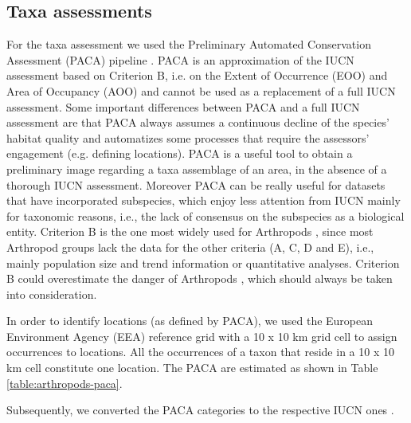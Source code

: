     \subsection{Taxa assessments}
    \label{subsec:arthropods-taxa-assessments}
For the taxa assessment we used the Preliminary Automated Conservation Assessment
(PACA) pipeline \parencite{stevart2019a-third}. PACA is an approximation of the IUCN
assessment based on Criterion B, i.e. on the Extent of Occurrence (EOO) and
Area of Occupancy (AOO) and cannot be used as a replacement of a full IUCN
assessment. Some important differences between PACA and a full IUCN assessment
are that PACA always assumes a continuous decline of the species’ habitat
quality and automatizes some processes that require the assessors' engagement
(e.g. defining locations). PACA is a useful tool to obtain a preliminary image
regarding a taxa assemblage of an area, in the absence of a thorough IUCN assessment.
Moreover PACA can be really useful for datasets that have incorporated subspecies,
which enjoy less attention from IUCN mainly for taxonomic reasons, i.e., the
lack of consensus on the subspecies as a biological entity. Criterion B is the
one most widely used for Arthropods \parencite{cardoso2011adapting,carpaneto2015a-red-list},
since most Arthropod groups lack the data for the other criteria (A, C, D and E),
i.e., mainly population size and trend information or quantitative analyses.
Criterion B could overestimate the danger of Arthropods \parencite{cardoso2011adapting},
which should always be taken into consideration.

In order to identify locations (as defined by PACA), we used the European
Environment Agency (EEA) reference grid with a 10 x 10 km grid cell to assign
occurrences to locations. All the occurrences of a taxon that reside in a
10 x 10 km cell constitute one location. The PACA are estimated as shown in Table \ref{table:arthropods-paca}.

Subsequently, we converted the PACA categories to the respective IUCN ones \parencite{stevart2019a-third}.

